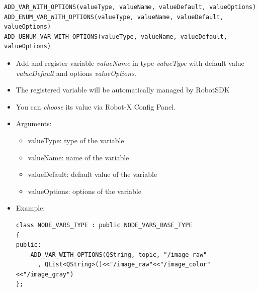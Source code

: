 \documentclass[a4paper,10pt]{book}
\begin{document}
\begin{mdframed}
\begin{verbatim}
ADD_VAR_WITH_OPTIONS(valueType, valueName, valueDefault, valueOptions)
ADD_ENUM_VAR_WITH_OPTIONS(valueType, valueName, valueDefault, valueOptions)
ADD_UENUM_VAR_WITH_OPTIONS(valueType, valueName, valueDefault, valueOptions)
\end{verbatim}
\begin{itemize}
 \item Add and register variable {\em{valueName}} in type {\em{valueType}} with default value {\em{valueDefault}} and options {\em{valueOptions}}.
 \item The registered variable will be automatically managed by RobotSDK
 \item You can {\em{choose}} its value via Robot-X Config Panel.
 \item Arguments:
 \begin{itemize}
  \item valueType: type of the variable
  \item valueName: name of the variable
  \item valueDefault: default value of the variable
  \item valueOptions: options of the variable
 \end{itemize}
 \item Example:
 \begin{verbatim}
class NODE_VARS_TYPE : public NODE_VARS_BASE_TYPE
{
public:
    ADD_VAR_WITH_OPTIONS(QString, topic, "/image_raw"
      , QList<QString>()<<"/image_raw"<<"/image_color"<<"/image_gray")
};
 \end{verbatim}
\end{itemize}
\end{mdframed}
\end{document}
